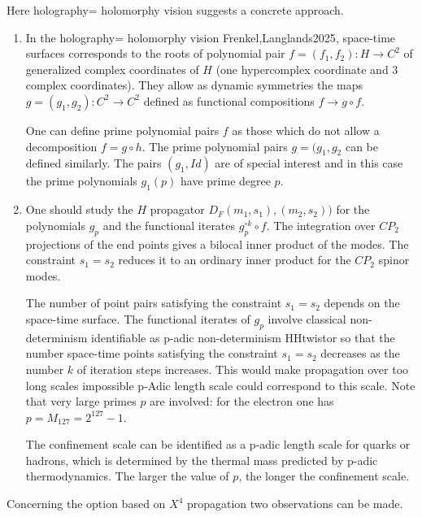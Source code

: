 \documentclass[10pt,epsf]{article}
\begin{document}
Here  holography= holomorphy vision  suggests a concrete approach.

\begin{enumerate}

\item  In the holography= holomorphy vision \cite{btart}{Frenkel,Langlands2025},  space-time surfaces corresponds to the roots of  polynomial pair $f=(f_1,f_2): H\rightarrow C^2$ of generalized complex coordinates of $H$  (one hypercomplex coordinate and 3 complex coordinates). They allow as dynamic symmetries the maps $g=(g_1,g_2): C^2\rightarrow C^2$ defined as functional compositions $f\rightarrow g\circ f$. 

One can define prime polynomial pairs  $f$ as those which do not allow a decomposition $f=g\circ h$. The prime polynomial pairs $g=(g_1,g_2$ can be defined similarly. The pairs $(g_1,Id)$ are of special interest and in this case the prime polynomials $g_1(p)$ have prime degree $p$. 

\item One should study the $H$  propagator $D_F(m_1,s_1),(m_2,s_2))$ for the polynomials $g_p$ and the functional iterates $g_p^{\circ k}\circ f$. The integration over $CP_2$ projections of  the end points gives a bilocal inner product of the modes. The constraint $s_1=s_2$ reduces it to an  ordinary inner product for the $CP_2$ spinor modes.

The number of point pairs  satisfying the constraint $s_1=s_2$ depends on the space-time surface.   The functional iterates  of $g_p$ involve   classical non-determinism identifiable as p-adic non-determinism \cite{btart}{HHtwistor} so that the number space-time points satisfying the constraint $s_1=s_2$ decreases as the number $k$ of iteration steps increases. This would make propagation  over too long scales impossible  p-Adic length scale could correspond to this scale. Note that very large primes $p$  are involved: for the electron  one has $p=M_{127}=2^{127}-1$.

The confinement scale  can be identified as a p-adic length scale for quarks or hadrons, which is determined by the  thermal mass  predicted by p-adic thermodynamics. The larger  the value of $p$,   the longer the confinement scale. 

\end{enumerate}


Concerning the option based on $X^4$ propagation two observations can be made.
\end{document}
